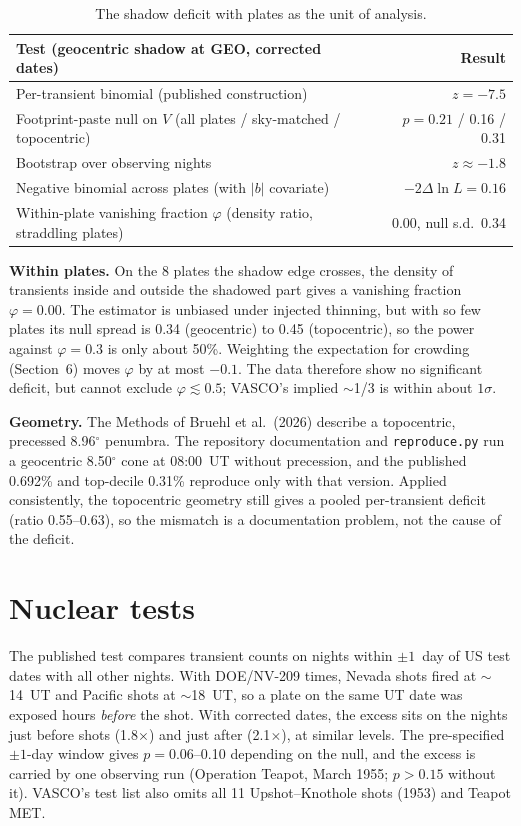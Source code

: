 \documentclass[11pt,a4paper]{article}
\begin{document}
\begin{table}[h]
\centering\small
\begin{tabular}{lr}
\toprule
Test (geocentric shadow at GEO, corrected dates) & Result \\
\midrule
Per-transient binomial (published construction) & $z=-7.5$ \\
Footprint-paste null on $V$ (all plates / sky-matched / topocentric) & $p=0.21$ / 0.16 / 0.31 \\
Bootstrap over observing nights & $z\approx-1.8$ \\
Negative binomial across plates (with $|b|$ covariate) & $-2\Delta\ln L=0.16$ \\
Within-plate vanishing fraction $\varphi$ (density ratio, straddling plates) & $0.00$, null s.d.\ 0.34 \\
\bottomrule
\end{tabular}
\caption{The shadow deficit with plates as the unit of analysis.}
\label{tab:shadow}
\end{table}

\textbf{Within plates.} On the 8 plates the shadow edge crosses, the density of transients inside and outside the
shadowed part gives a vanishing fraction $\varphi=0.00$. The estimator is unbiased under injected thinning, but with so
few plates its null spread is 0.34 (geocentric) to 0.45 (topocentric), so the power against $\varphi=0.3$ is only about
50\%. Weighting the expectation for crowding (Section~6) moves $\varphi$ by at most $-0.1$. The data therefore show
no significant deficit, but cannot exclude $\varphi\lesssim0.5$; VASCO's implied $\sim$1/3 is within about $1\sigma$.

\textbf{Geometry.} The Methods of Bruehl et al.\ (2026) describe a topocentric, precessed 8.96$^\circ$ penumbra. The
repository documentation and \texttt{reproduce.py} run a geocentric 8.50$^\circ$ cone at 08:00~UT without precession,
and the published 0.692\% and top-decile 0.31\% reproduce only with that version. Applied consistently, the topocentric
geometry still gives a pooled per-transient deficit (ratio 0.55--0.63), so the mismatch is a documentation problem,
not the cause of the deficit.

\section{Nuclear tests}

The published test compares transient counts on nights within $\pm1$~day of US test dates with all other nights.
With DOE/NV-209 times, Nevada shots fired at $\sim$14~UT and Pacific shots at $\sim$18~UT, so a plate on the same UT date
was exposed hours \emph{before} the shot. With corrected dates, the excess sits on the nights just before shots (1.8$\times$)
and just after (2.1$\times$), at similar levels. The pre-specified $\pm1$-day window gives $p=0.06$--0.10 depending on the
null, and the excess is carried by one observing run (Operation Teapot, March 1955; $p>0.15$ without it). VASCO's test
list also omits all 11 Upshot--Knothole shots (1953) and Teapot MET.
\end{document}
